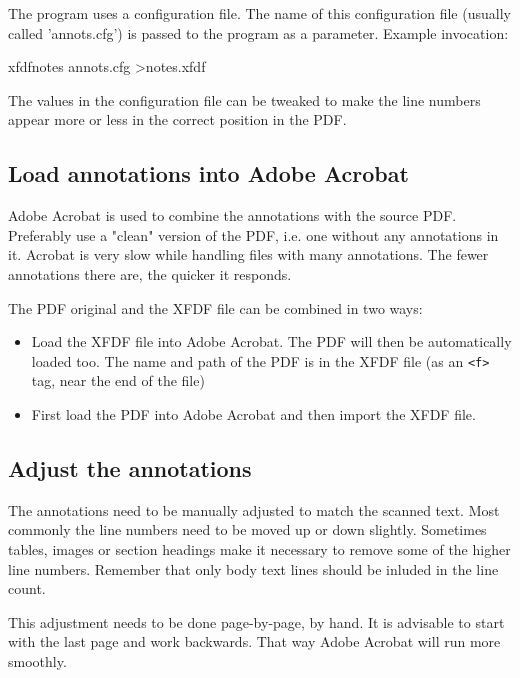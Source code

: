 \documentclass{article}
\begin{document}
The program uses a configuration file. The name of this configuration file
(usually called 'annots.cfg') is passed to the program as a parameter.
Example invocation:
  
\begin{verb}
         xfdfnotes annots.cfg >notes.xfdf
\end{verb}

The values in the configuration file can be tweaked to make the line numbers
appear more or less in the correct position in the PDF. 

\subsection{Load annotations into Adobe Acrobat}
\label{subsec:load}
Adobe Acrobat is used to combine the annotations with the source PDF.
Preferably use a "clean" version of the PDF, i.e. one without any annotations
in it.
Acrobat is very slow while handling files with many annotations.
The fewer annotations there are, the quicker it responds.

The PDF original and the XFDF file can be combined in two ways:
\begin{itemize}
\item Load the XFDF file into Adobe Acrobat.
The PDF will then be automatically loaded too.
The name and path of the PDF is in the XFDF file
(as an \verb+<f>+ tag, near the end of the file)
\item First load the PDF into Adobe Acrobat and then import the XFDF file.
\end{itemize}

    
\subsection{Adjust the annotations}
The annotations need to be manually adjusted to match the scanned text.
Most commonly the line numbers need to be moved up or down slightly.
  Sometimes tables, images or section headings make it necessary to remove
  some of the higher line numbers.
Remember that only body text lines should be inluded in the line count.
  
This adjustment needs to be done page-by-page, by hand.
It is advisable to start with the last page and work backwards.
That way Adobe Acrobat will run more smoothly.

\end{document}
